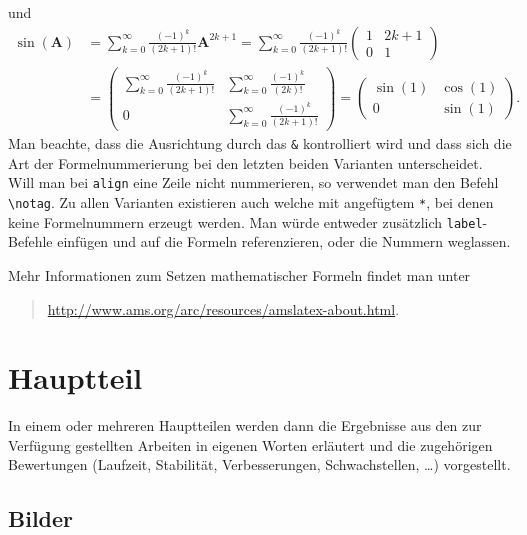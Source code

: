 \documentclass[12pt]{article}
\theoremstyle{definition}
\numberwithin{equation}{section}
\newcommand{\bfA}{\mathbf{A}}
\begin{document}
und
\begin{equation}
  \begin{split}
  \sin(\bfA) &= \sum_{k=0}^\infty \frac{(-1)^k}{(2k+1)!}\bfA^{\!2k+1}
    = \sum_{k=0}^\infty \frac{(-1)^k}{(2k+1)!}
  \begin{pmatrix}
    1 & 2k+1\\
    0 & 1
  \end{pmatrix} \\ &=
  \begin{pmatrix}
    \sum_{k=0}^\infty \frac{(-1)^k}{(2k+1)!} &
    \sum_{k=0}^\infty \frac{(-1)^k}{(2k)!}\\
    0 & \sum_{k=0}^\infty \frac{(-1)^k}{(2k+1)!}
  \end{pmatrix} =
  \begin{pmatrix}
    \sin(1) & \cos(1)\\
    0 & \sin(1)
  \end{pmatrix}.
  \end{split}
\end{equation}
Man beachte, dass die Ausrichtung durch das \verb|&| kontrolliert wird
und dass sich die Art der Formelnummerierung bei den letzten beiden
Varianten unterscheidet. Will man bei \texttt{align} eine Zeile nicht
nummerieren, so verwendet man den Befehl \verb|\notag|. Zu allen
Varianten existieren auch welche mit angefügtem \texttt{*}, bei denen
keine Formelnummern erzeugt werden. Man würde entweder zusätzlich
\texttt{label}-Befehle einfügen und auf die Formeln referenzieren,
oder die Nummern weglassen.

Mehr Informationen zum Setzen mathematischer Formeln findet man unter
\begin{quote}
  \url{http://www.ams.org/arc/resources/amslatex-about.html}.
\end{quote}

\section{Hauptteil}
\label{sec:Hauptteil}

In einem oder mehreren Hauptteilen werden dann die Ergebnisse aus den
zur Verfügung gestellten Arbeiten in eigenen Worten erläutert und die
zugehörigen Bewertungen (Laufzeit, Stabilität, Verbesserungen,
Schwachstellen, \ldots) vorgestellt.

\subsection{Bilder}
\label{sec:Bilder}
\end{document}
